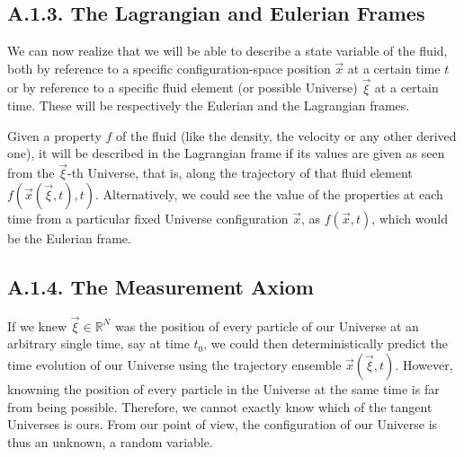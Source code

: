 \documentclass[11pt, a4paper]{article} %
\newcommand{\R}{\mathbb{R}} %
\begin{document}

\subsection*{A.1.3. The Lagrangian and Eulerian Frames}

We can now realize that we will be able to describe a state variable of the fluid, both by reference to a specific configuration-space position $\vec{x}$ at a certain time $t$ or by reference to a specific fluid element (or possible Universe) $\vec{\xi}$ at a certain time. These will be respectively the Eulerian and the Lagrangian frames. 

Given a property $f$ of the fluid (like the density, the velocity or any other derived one), it will be described in the Lagrangian frame if its values are given as seen from the $\vec{\xi}$-th Universe, that is, along the trajectory of that fluid element $f(\vec{x}(\vec{\xi},t),t)$. Alternatively, we could see the value of the properties at each time from a particular fixed Universe configuration $\vec{x}$, as $f(\vec{x},t)$, which would be the Eulerian frame.
 




 
\subsection*{A.1.4. The Measurement Axiom}


If we knew $\vec{\xi}\in\R^N$ was the position of every particle of our Universe at an arbitrary single time, say at time $t_0$, we could then deterministically predict the time evolution of our Universe using the trajectory ensemble $\vec{x}(\vec{\xi},t)$. However, knowning the position of every particle in the Universe at the same time is far from being possible. Therefore, we cannot exactly know which of the tangent Universes is ours. From our point of view, the configuration of our Universe is thus an unknown, a random variable. 
\end{document}
